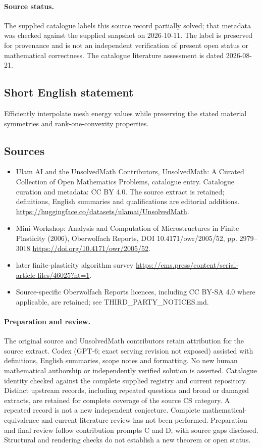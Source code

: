\documentclass[11pt]{article}
\begin{document}
\paragraph{Source status.}
The supplied catalogue labels this source record partially solved; that metadata was checked against the supplied snapshot on 2026-10-11. The label is preserved for provenance and is not an independent verification of present open status or mathematical correctness. The catalogue literature assessment is dated 2026-08-21.
\subsection{Short English statement}
Efficiently interpolate mesh energy values while preserving the stated material symmetries and rank-one-convexity properties.
\subsection{Sources}
\begin{itemize}
\item[S1] Ulam AI and the UnsolvedMath Contributors, UnsolvedMath: A Curated Collection of Open Mathematics Problems, catalogue entry. Catalogue curation and metadata: CC BY 4.0. The source extract is retained; definitions, English summaries and qualifications are editorial additions.
\url{https://huggingface.co/datasets/ulamai/UnsolvedMath}.
\item[S2] Mini-Workshop: Analysis and Computation of Microstructures in Finite Plasticity (2006), Oberwolfach Reports, DOI 10.4171/owr/2005/52, pp. 2979--3018
\url{https://doi.org/10.4171/owr/2005/52}.
\item[S3] later finite-plasticity algorithm survey
\url{https://ems.press/content/serial-article-files/46025?nt=1}.
\item Source-specific Oberwolfach Reports licences, including CC BY-SA 4.0 where applicable, are retained; see THIRD\_PARTY\_NOTICES.md.
\end{itemize}
\paragraph{Preparation and review.}
The original source and UnsolvedMath contributors retain attribution for the source extract. Codex (GPT-6; exact serving revision not exposed) assisted with definitions, English summaries, scope notes and formatting. No new human mathematical authorship or independently verified solution is asserted. Catalogue identity checked against the complete supplied registry and current repository. Distinct upstream records, including repeated questions and broad or damaged extracts, are retained for complete coverage of the source CS category. A repeated record is not a new independent conjecture. Complete mathematical-equivalence and current-literature review has not been performed. Preparation and final review follow contribution prompts C and D, with source gaps disclosed. Structural and rendering checks do not establish a new theorem or open status.
\label{end:statement}
\end{document}
